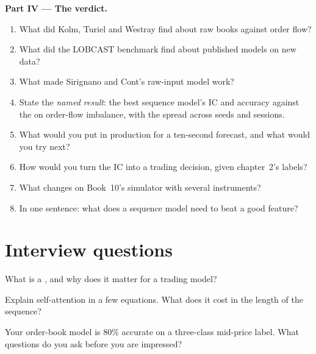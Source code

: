 \begin{problem}
\medskip\noindent\textbf{Part IV --- The verdict.}
\begin{enumerate}[resume]
\item What did Kolm, Turiel and Westray find about raw books against order flow?
\item What did the LOBCAST benchmark find about published models on new data?
\item What made Sirignano and Cont's raw-input model work?
\item State the \emph{named result}: the best sequence model's IC and accuracy against the  on order-flow
imbalance, with the spread across seeds and sessions.
\item What would you put in production for a ten-second forecast, and what would you try next?
\item How would you turn the IC into a trading decision, given chapter~2's labels?
\item What changes on Book~10's simulator with several instruments?
\item In one sentence: what does a sequence model need to beat a good feature?
\end{enumerate}
\end{problem}

\section{Interview questions}

\begin{interviewq}\label{iq:ml:sequence-models-on-order-books:1}
What is a , and why does it matter for a trading model?
\end{interviewq}

\begin{interviewq}\label{iq:ml:sequence-models-on-order-books:2}
Explain self-attention in a few equations. What does it cost in the length of the sequence?
\end{interviewq}

\begin{interviewq}\label{iq:ml:sequence-models-on-order-books:3}
Your order-book model is 80\% accurate on a three-class mid-price label. What questions do you ask before you are
impressed?
\end{interviewq}

